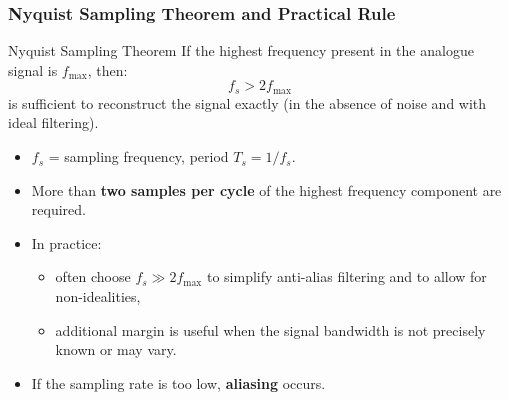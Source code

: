 \begin{frame}
	\frametitle{Nyquist Sampling Theorem and Practical Rule}
	\begin{block}{Nyquist Sampling Theorem}
		If the highest frequency present in the analogue signal is $f_{\max}$, then:
		\begin{equation}
			f_s > 2 f_{\max}
		\end{equation}
		is sufficient to reconstruct the signal exactly (in the absence of noise and with ideal filtering).
	\end{block}
	\begin{itemize}
		\item $f_s$ = sampling frequency, period $T_s = 1/f_s$.
		\item More than \textbf{two samples per cycle} of the highest frequency component are required.
		\item In practice:
		\begin{itemize}
			\item often choose $f_s \gg 2 f_{\max}$ to simplify anti-alias filtering and to allow for non-idealities,
			\item additional margin is useful when the signal bandwidth is not precisely known or may vary.
		\end{itemize}
		\item If the sampling rate is too low, \textbf{aliasing} occurs.
	\end{itemize}
\end{frame}
